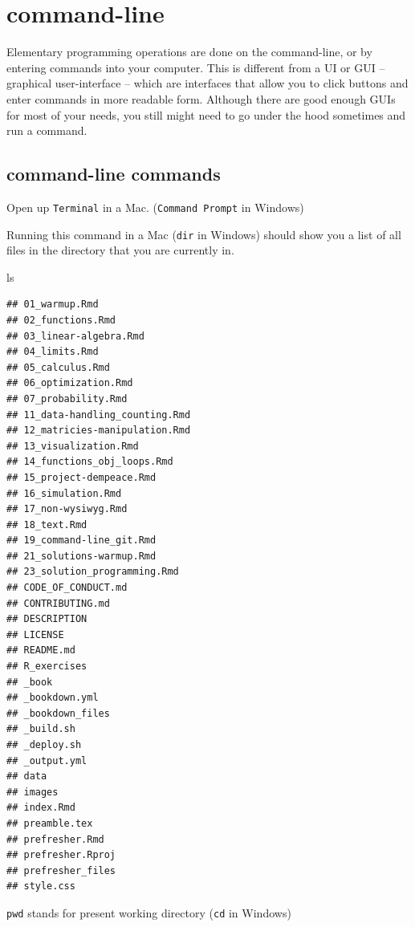 \documentclass[]{book}
\newenvironment{Shaded}{\begin{snugshade}}{\end{snugshade}}
\newcommand{\FunctionTok}[1]{\textcolor[rgb]{0.00,0.00,0.00}{#1}}
\theoremstyle{definition}
\theoremstyle{definition}
\theoremstyle{definition}
\theoremstyle{remark}
\begin{document}
\hypertarget{command-line}{%
\section{command-line}\label{command-line}}

Elementary programming operations are done on the command-line, or by entering commands into your computer. This is different from a UI or GUI -- graphical user-interface -- which are interfaces that allow you to click buttons and enter commands in more readable form. Although there are good enough GUIs for most of your needs, you still might need to go under the hood sometimes and run a command.

\hypertarget{command-line-commands}{%
\subsection{command-line commands}\label{command-line-commands}}

Open up \texttt{Terminal} in a Mac. (\texttt{Command\ Prompt} in Windows)

Running this command in a Mac (\texttt{dir} in Windows) should show you a list of all files in the directory that you are currently in.

\begin{Shaded}
\begin{Highlighting}[]
\FunctionTok{ls}
\end{Highlighting}
\end{Shaded}

\begin{verbatim}
## 01_warmup.Rmd
## 02_functions.Rmd
## 03_linear-algebra.Rmd
## 04_limits.Rmd
## 05_calculus.Rmd
## 06_optimization.Rmd
## 07_probability.Rmd
## 11_data-handling_counting.Rmd
## 12_matricies-manipulation.Rmd
## 13_visualization.Rmd
## 14_functions_obj_loops.Rmd
## 15_project-dempeace.Rmd
## 16_simulation.Rmd
## 17_non-wysiwyg.Rmd
## 18_text.Rmd
## 19_command-line_git.Rmd
## 21_solutions-warmup.Rmd
## 23_solution_programming.Rmd
## CODE_OF_CONDUCT.md
## CONTRIBUTING.md
## DESCRIPTION
## LICENSE
## README.md
## R_exercises
## _book
## _bookdown.yml
## _bookdown_files
## _build.sh
## _deploy.sh
## _output.yml
## data
## images
## index.Rmd
## preamble.tex
## prefresher.Rmd
## prefresher.Rproj
## prefresher_files
## style.css
\end{verbatim}

\texttt{pwd} stands for present working directory (\texttt{cd} in Windows)
\end{document}
